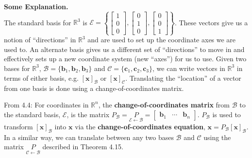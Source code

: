 \documentclass[10pt]{book}
\newenvironment{boxdef}{\begin{mdframed}[backgroundcolor=gray!30,linewidth=0pt,nobreak=true]}{\end{mdframed}}
\newcommand{\R}{\mathbb{R}}
\newcommand{\B}{\mathscr{B}}
\newcommand{\C}{\mathscr{C}}
\newcommand{\E}{\mathscr{E}}
\newcommand{\vect}[1]{\ensuremath{\boldsymbol{\mathbf{#1}}}}
\newcommand{\vectB}[1][x]{[\vect{#1}]_\B}
\newcommand{\vectC}[1][x]{[\vect{#1}]_\C}
\newcommand{\CoC}[2]{\underset{#2\leftarrow #1}{P}}
\begin{document}
\begin{boxdef}
	\textbf{Some Explanation.} \\
	The standard basis for $\R^3$ is $\mathscr{E}=\left\{\begin{bmatrix}1\\0\\0\end{bmatrix},\begin{bmatrix}0\\1\\0\end{bmatrix},\begin{bmatrix}0\\0\\1\end{bmatrix}\right\}$. These vectors give us a notion of ``directions'' in $\R^3$ and are used to set up the coordinate axes we are used to. An alternate basis gives us a different set of ``directions'' to move in and effectively sets up a new coordinate system (new ``axes'') for us to use. Given two bases for $\R^3$, $\B=\{\vect{b}_1,\vect{b}_2,\vect{b}_3\}$ and $\C=\{\vect{c}_1,\vect{c}_2,\vect{c}_3\}$, we can write vectors in $\R^3$ in terms of either basis, e.g. $\vectB[x]$ or $\vectC[x]$. Translating the ``location'' of a vector from one basis is done using a change-of-coordinates matrix.
	
	From 4.4: For coordinates in $\R^n$, the \textbf{change-of-coordinates matrix} from $\B$ to the standard basis, $\E$, is the matrix $P_\B=\CoC{\B}{\E}=\begin{bmatrix}\vect{b}_1&\cdots&\vect{b}_n\end{bmatrix}.$
	$P_\B$ is used to transform $\vectB$ into $\vect{x}$ via the \textbf{change-of-coordinates equation}, $\vect{x}=P_\B\vectB$. In a similar way, we can translate between any two bases $\B$ and $\C$ using the matrix $\CoC{\B}{\C}$ described in Theorem 4.15.
\end{boxdef}
\end{document}

